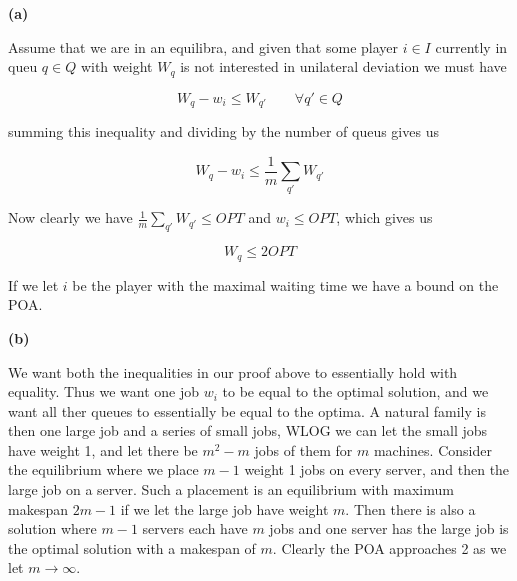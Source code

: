 

\textbf{(a)}

Assume that we are in an equilibra, and given that some player $i\in I$ currently in queu $q \in Q$ with weight $W_q$ is not interested in unilateral deviation we must have

$$
W_q - w_i \le W_{q'} \qquad \forall q' \in Q
$$

summing this inequality and dividing by the number of queus gives us

$$
W_q - w_i \le \frac{1}{m} \sum_{q'} W_{q'}
$$

Now clearly we have $\frac{1}{m} \sum_{q'} W_{q'} \le OPT$ and $w_i \le OPT$, which gives us

$$
W_q \le 2 OPT
$$

If we let $i$ be the player with the maximal waiting time we have a bound on the POA.

\textbf{(b)}

We want both the inequalities in our proof above to essentially hold with equality. Thus we want one job $w_i$ to be equal to the optimal solution, and we want all ther queues to essentially be equal to the optima. A natural family is then one large job and a series of small jobs, WLOG we can let the small jobs have weight 1, and let there be $m^2-m$ jobs of them for $m$ machines. Consider the equilibrium where we place $m-1$ weight 1 jobs on every server, and then the large job on a server. Such a placement is an equilibrium with maximum makespan $2m -1$ if we let the large job have weight $m$. Then there is also a solution where $m-1$ servers each have $m$ jobs and one server has the large job is the optimal solution with a makespan of $m$. Clearly the POA approaches 2 as we let $m \rightarrow \infty$.




